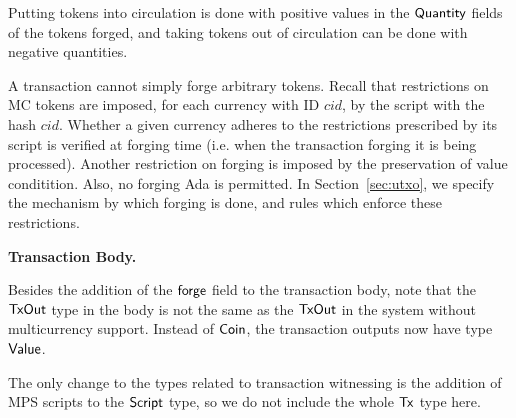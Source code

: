 Putting tokens into circulation is done with positive values in the $\mathsf{Quantity}$
fields of the tokens forged, and taking tokens out of circulation can be done
with negative quantities.

A transaction cannot simply forge arbitrary tokens. Recall that restrictions on
MC tokens are imposed, for each currency with ID $cid$, by the script
with the hash $cid$. Whether a given currency adheres to the restrictions
prescribed by its script is verified at forging time (i.e. when the transaction
forging it is being processed). Another restriction on forging is imposed by
the preservation of value conditition. Also, no forging Ada
is permitted. In Section~\ref{sec:utxo}, we specify the mechanism by which
forging is done, and rules which enforce these restrictions.

\textbf{Transaction Body.}

Besides the addition of the $\mathsf{forge}$ field to the transaction body,
note that the $\mathsf{TxOut}$ type in the body is not the same as
the $\mathsf{TxOut}$ in the system without multicurrency support. Instead of
$\mathsf{Coin}$, the transaction outputs now have type $\mathsf{Value}$.

The only change to the types related to transaction witnessing is the addition
of MPS scripts to the $\mathsf{Script}$ type, so we do not include the whole $\mathsf{Tx}$ type here.

